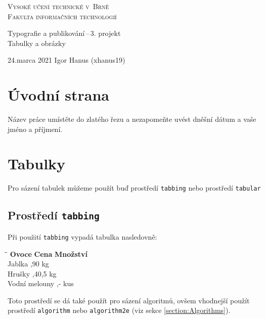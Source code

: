 \documentclass[a4paper, 11pt]{article}
\begin{document}
\begin{titlepage}
    \begin{center}
        {\Huge\textsc{Vysoké učení technické v~Brně}}\\[0.4em]
        {\huge\textsc{Fakulta informačních technologií}}
        
    
    
    {\LARGE 
        Typografie a publikování\,--\,3. projekt}\\[0.3em]
        {\Huge Tabulky a obrázky}
    
    \end{center}
    
    {\Large 24.marca 2021 \hfill Igor Hanus (xhanus19)} 
    
\end{titlepage}




\section{Úvodní strana}
Název práce umístěte do zlatého řezu a nezapomeňte uvést dněšní dátum a vaše jméno a příjmení.

\section{Tabulky}
Pro sázení tabulek můžeme použít buď prostředí \verb|tabbing| nebo prostředí \verb|tabular|

\subsection{Prostředí \texttt{tabbing}}
Při použití \texttt{tabbing} vypadá tabulka nasledovně:

\begin{tabbing}
\hspace*{2.8cm}\=\hspace*{1.4cm}\=\hspace*{2cm}\kill
\textbf{Ovoce} \> \textbf{Cena} \> \textbf{Množství}\\
Jablka ,90 kg \\
Hrušky ,40,5 kg \\
Vodní melouny ,- kus \\
\end{tabbing}
Toto prostředí se dá také použít pro sázení algoritmů, ovšem vhodnejší použít prostředí \texttt{algorithm} nebo \texttt{algorithm2e} (viz sekce \ref{section:Algorithms}).
\end{document}
